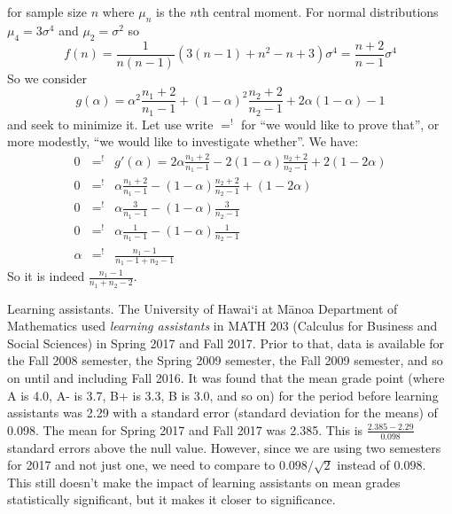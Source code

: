 for sample size $n$ where $\mu_n$ is the $n$th central moment. For normal distributions $\mu_4=3\sigma^4$ and $\mu_2=\sigma^2$ so
\[
	f(n) = \frac{1}{n(n-1)}(3(n-1)+n^2-n+3)\sigma^4 = \frac{n+2}{n-1}\sigma^4
\]
So we consider
\[
	g(\alpha) = \alpha^2\frac{n_1+2}{n_1-1} + (1-\alpha)^2 \frac{n_2+2}{n_2-1} + 2\alpha(1-\alpha) - 1
\]
and seek to minimize it.
Let use write $=^!$ for ``we would like to prove that'', or more modestly, ``we would like to investigate whether''.
We have:
\begin{eqnarray*}
	0 &=^!& g'(\alpha) = 2\alpha\frac{n_1+2}{n_1-1} - 2(1-\alpha) \frac{n_2+2}{n_2-1} + 2(1-2\alpha)\\
	0 &=^!& \alpha\frac{n_1+2}{n_1-1} - (1-\alpha) \frac{n_2+2}{n_2-1} + (1-2\alpha)\\
	0 &=^!& \alpha\frac{3}{n_1-1} - (1-\alpha) \frac{3}{n_2-1}\\
	0 &=^!& \alpha\frac{1}{n_1-1} - (1-\alpha) \frac{1}{n_2-1}\\
	\alpha &=^!& \frac{n_1-1}{n_1-1+n_2-1}
\end{eqnarray*}
So it is indeed $\frac{n_1-1}{n_1+n_2-2}$.




\begin{example}{Learning assistants.}%
The University of Hawai\textquoteleft i at M\=anoa Department of Mathematics used \emph{learning assistants} in MATH 203 (Calculus for Business and Social Sciences) in Spring 2017 and Fall 2017.
Prior to that, data is available for the Fall 2008 semester, the Spring 2009 semester, the Fall 2009 semester, and so on until and including Fall 2016.
It was found that the mean grade point (where A is 4.0, A- is 3.7, B+ is 3.3, B is 3.0, and so on) for the period before learning assistants was 2.29 with a standard error (standard deviation for the means) of 0.098.
The mean for Spring 2017 and Fall 2017 was 2.385. This is $\frac{2.385-2.29}{0.098}$ standard errors above the null value. However, since we are using two semesters for 2017 and not just one, we need to compare to $0.098/\sqrt{2}$ instead of $0.098$. This still doesn't make the impact of learning assistants on mean grades statistically significant, but it makes it closer to significance.
\end{example}